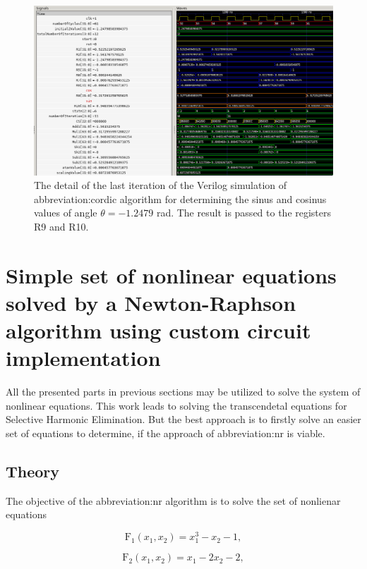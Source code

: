 \documentclass[a4paper, twoside, 11pt]{article}
\begin{document}
        \begin{figure}[htbp!]
            \centering
            \includegraphics[width=1\textwidth]{src/png/cordic-verilog-end-of-the-simulation.png}
            \caption{The detail of the last iteration of the Verilog simulation of \gls{abbreviation:cordic} algorithm for determining the sinus and cosinus values of angle $\theta = -1.2479$ rad. The result is passed to the registers R9 and R10.}
            \label{fig:cordic-verilog-end-of-the-simulation}
        \end{figure}

\section{Simple set of nonlinear equations solved by a Newton-Raphson algorithm using custom circuit implementation}
    All the presented parts in previous sections may be utilized to solve the system of nonlinear equations. This work leads to solving the transcendetal equations for Selective Harmonic Elimination. But the best approach is to firstly solve an easier set of equations to determine, if the approach of \gls{abbreviation:nr} is viable.
    \subsection{Theory}
        The objective of the \gls{abbreviation:nr} algorithm is to solve the set of nonlienar equations


        \begin{equation}
            \text{F}_1 (x_1, x_2) = x_1^3 - x_2 - 1, 
        \end{equation}

        \begin{equation}
            \text{F}_2 (x_1, x_2) = x_1 - 2 x_2 - 2, 
        \end{equation}
\end{document}
